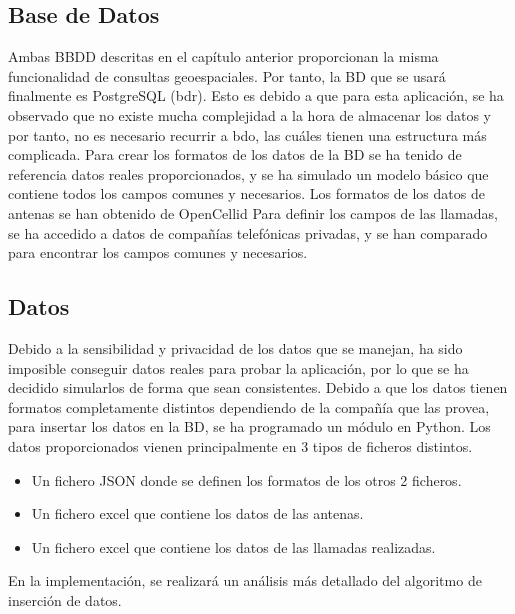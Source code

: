   \subsection{Base de Datos}
    Ambas BBDD descritas en el capítulo anterior proporcionan la misma funcionalidad de consultas geoespaciales.
    Por tanto, la BD que se usará finalmente es PostgreSQL (\ac{bdr}). Esto es debido a que para esta aplicación, se ha observado que no existe mucha complejidad a la hora de almacenar los datos y por tanto, no es necesario recurrir a \ac{bdo}, las cuáles tienen una estructura más complicada. 
    Para crear los formatos de los datos de la BD se ha tenido de referencia datos reales proporcionados, y se ha simulado un modelo básico que contiene todos los campos comunes y necesarios.
    Los formatos de los datos de antenas se han obtenido de OpenCellid \cite{opencellid}
    Para definir los campos de las llamadas, se ha accedido a datos de compañías telefónicas privadas, y se han comparado para encontrar los campos comunes y necesarios.
       
       
  \subsection{Datos}
    Debido a la sensibilidad y privacidad de los datos que se manejan, ha sido imposible conseguir datos reales para probar la aplicación, por lo que se ha decidido simularlos de forma que sean consistentes. 
    Debido a que los datos tienen formatos completamente distintos dependiendo de la compañía que las provea, para insertar los datos en la BD, se ha programado un módulo en Python.
    Los datos proporcionados vienen principalmente en 3 tipos de ficheros distintos.
    
    \begin{itemize}
      \item Un fichero JSON donde se definen los formatos de los otros 2 ficheros.
      \item Un fichero excel que contiene los datos de las antenas.
      \item Un fichero excel que contiene los datos de las llamadas realizadas.
    \end{itemize}
    En la implementación, se realizará un análisis más detallado del algoritmo de inserción de datos.